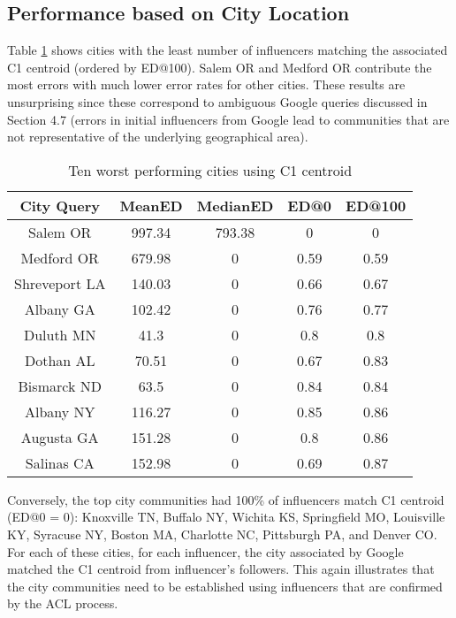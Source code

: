 \subsection{Performance based on City Location}

Table \ref{table_4_6} shows cities with the least number of influencers matching the associated C1 centroid (ordered by ED@100). Salem OR and Medford OR contribute the most errors with much lower error rates for other cities. These results are unsurprising since these correspond to ambiguous Google queries discussed in Section 4.7 (errors in initial influencers from Google lead to communities that are not representative of the underlying geographical area). 

\begin{table}
\small
\caption{Ten worst performing cities using C1 centroid}
\label{table_4_6}
\begin{center}
\begin{tabular}{|c|c|c|c|c|}
\hline
\bfseries City Query & \bfseries MeanED & \bfseries MedianED & \bfseries ED@0 & \bfseries ED@100\\
\hline
Salem OR&997.34&793.38&0&0\\
\hline
Medford OR&679.98&0&0.59&0.59\\
\hline
Shreveport LA&140.03&0&0.66&0.67\\
\hline
Albany GA&102.42&0&0.76&0.77\\
\hline
Duluth MN&41.3&0&0.8&0.8\\
\hline
Dothan AL&70.51&0&0.67&0.83\\
\hline
Bismarck ND&63.5&0&0.84&0.84\\
\hline
Albany NY&116.27&0&0.85&0.86\\
\hline
Augusta GA&151.28&0&0.8&0.86\\
\hline
Salinas CA&152.98&0&0.69&0.87\\
\hline
\end{tabular}
\end{center}
\end{table}

Conversely, the top city communities had 100\% of influencers match C1 centroid (ED@0 = 0): Knoxville TN, Buffalo NY, Wichita KS, Springfield MO, Louisville KY, Syracuse NY, Boston MA, Charlotte NC, Pittsburgh PA, and Denver CO. For each of these cities, for each influencer, the city associated by Google matched the C1 centroid from influencer's followers. This again illustrates that the city communities need to be established using influencers that are confirmed by the ACL process.
\fi

